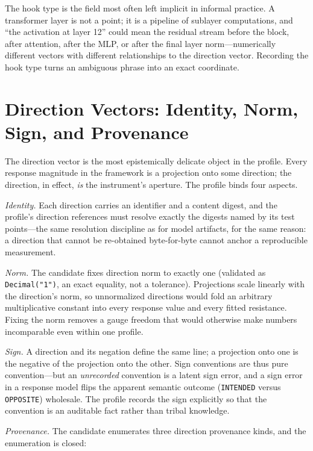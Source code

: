 The hook type is the field most often left implicit in informal practice. A transformer layer is not a point; it is a
pipeline of sublayer computations, and ``the activation at layer 12'' could
mean the residual stream before the block, after attention, after the MLP,
or after the final layer norm---numerically different vectors with different
relationships to the direction vector. Recording the hook type turns an
ambiguous phrase into an exact coordinate.

\section{Direction Vectors: Identity, Norm, Sign, and Provenance}\label{ch05:directions}

The direction vector is the most epistemically delicate object in the
profile. Every response magnitude in the framework is a projection onto some
direction; the direction, in effect, \emph{is} the instrument's aperture.
The profile binds four aspects.

\emph{Identity.} Each direction carries an identifier and a content digest,
and the profile's direction references must resolve exactly the digests
named by its test points---the same resolution discipline as for model
artifacts, for the same reason: a direction that cannot be re-obtained
byte-for-byte cannot anchor a reproducible measurement.

\emph{Norm.} The candidate fixes direction norm to exactly one (validated as
\texttt{Decimal("1")}, an exact equality, not a tolerance). Projections
scale linearly with the direction's norm, so unnormalized directions would
fold an arbitrary multiplicative constant into every response value and
every fitted resistance. Fixing the norm removes a gauge freedom that would
otherwise make numbers incomparable even within one profile.

\emph{Sign.} A direction and its negation define the same line; a
projection onto one is the negative of the projection onto the other. Sign
conventions are thus pure convention---but an \emph{unrecorded} convention
is a latent sign error, and a sign error in a response model flips the
apparent semantic outcome (\texttt{INTENDED} versus \texttt{OPPOSITE})
wholesale. The profile records the sign explicitly so that the convention is
an auditable fact rather than tribal knowledge.

\emph{Provenance.} The candidate enumerates three direction provenance
kinds, and the enumeration is closed:

